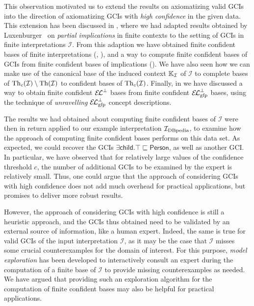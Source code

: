 This observation motivated us to extend the results on axiomatizing valid GCIs into the
direction of axiomatizing GCIs with \emph{high confidence} in the given data.  This
extension has been discussed in , where we had adapted results
obtained by Luxenburger~\cite{diss:Luxenburger} on \emph{partial implications} in finite
contexts to the setting of GCIs in finite interpretations $\mathcal{I}$.  From this
adaption we have obtained finite confident bases of finite interpretations
(, ), and a way to compute finite
confident bases of GCIs from finite confident bases of implications
().  We have also
seen how we can make use of the canonical base of the induced context ${\mathbb{K}}_{\mathcal{I}}$ of $\mathcal{I}$ to complete bases of $\operatorname{Th}_{c}(\mathcal{I}) \setminus
\operatorname{Th}(\mathcal{I})$ to confident bases of $\operatorname{Th}_{c}(\mathcal{I})$.  Finally, in
 we have discussed a way to obtain finite confident ${{\mathcal{E}\kern-.3ex\mathcal{L}}^\bot}$
bases from finite confident $\ELgfpbot$ bases, using the technique of \emph{unravelling}
$\ELgfpbot$ concept descriptions.

The results we had obtained about computing finite confident bases of $\mathcal{I}$ were
then in return applied to our example interpretation ${\mathcal{I}_{\text{DBpedia}}}$, to examine how the
approach of computing finite confident bases performs on this data set.  As expected, we
could recover the GCIs $\exists \mathsf{child}. \top \sqsubseteq \mathsf{Person}$, as well
as another GCI.  In particular, we have observed that for relatively large values of the
confidence threshold $c$, the number of additional GCIs to be examined by the expert is
relatively small.  Thus, one could argue that the approach of considering GCIs with high
confidence does not add much overhead for practical applications, but promises to deliver
more robust results.

However, the approach of considering GCIs with high confidence is still a heuristic
approach, and the GCIs thus obtained need to be validated by an external source of
information, like a human expert.  Indeed, the same is true for valid GCIs of the input
interpretation $\mathcal{I}$, as it may be the case that $\mathcal{I}$ misses some crucial
counterexamples for the domain of interest.  For this purpose, \emph{model exploration}
has been developed to interactively consult an expert during the computation of a finite
base of $\mathcal{I}$ to provide missing counterexamples as needed.  We have argued that
providing such an exploration algorithm for the computation of finite confident bases may
also be helpful for practical applications.

